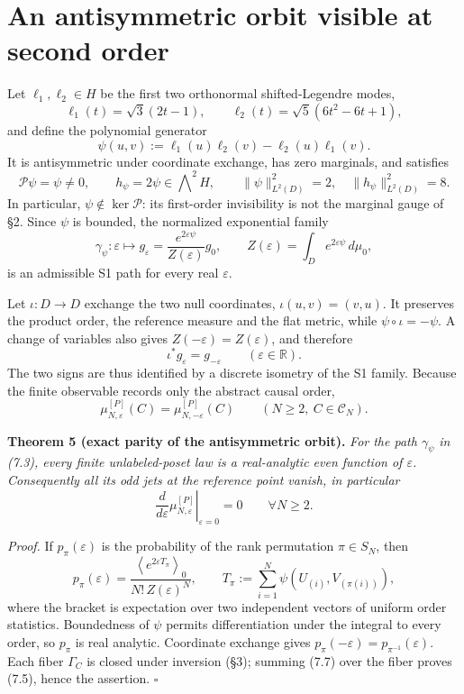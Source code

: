 \documentclass[11pt]{article}
\begin{document}
\section{An antisymmetric orbit visible at second order}

Let \(\ell_1,\ell_2\in H\) be the first two orthonormal shifted-Legendre modes, \[ \ell_1(t)=\sqrt3(2t-1), \qquad \ell_2(t)=\sqrt5(6t^2-6t+1), \] and define the polynomial generator \[ \boxed{ \psi(u,v):=\ell_1(u)\ell_2(v)-\ell_2(u)\ell_1(v).} \tag{7.1} \] It is antisymmetric under coordinate exchange, has zero marginals, and satisfies \[ \mathcal P\psi=\psi\ne0, \qquad h_\psi=2\psi\in\bigwedge\nolimits^2H, \qquad \|\psi\|_{L^2(D)}^2=2, \quad \|h_\psi\|_{L^2(D)}^2=8. \tag{7.2} \] In particular, \(\psi\notin\ker\mathcal P\): its first-order invisibility is not the marginal gauge of \S2. Since \(\psi\) is bounded, the normalized exponential family \[ \gamma_\psi:\varepsilon\longmapsto g_\varepsilon =\frac{e^{2\varepsilon\psi}}{Z(\varepsilon)}g_0, \qquad Z(\varepsilon)=\int_De^{2\varepsilon\psi}\,d\mu_0, \tag{7.3} \] is an admissible S1 path for every real \(\varepsilon\).

Let \(\iota:D\to D\) exchange the two null coordinates, \(\iota(u,v)=(v,u)\). It preserves the product order, the reference measure and the flat metric, while \(\psi\circ\iota=-\psi\). A change of variables also gives \(Z(-\varepsilon)=Z(\varepsilon)\), and therefore \[ \boxed{\iota^*g_\varepsilon=g_{-\varepsilon}} \qquad(\varepsilon\in\mathbb R). \tag{7.4} \] The two signs are thus identified by a discrete isometry of the S1 family. Because the finite observable records only the abstract causal order, \[ \boxed{ \mu_{N,\varepsilon}^{[P]}(C) =\mu_{N,-\varepsilon}^{[P]}(C)} \qquad(N\ge2,\ C\in\mathcal C_N). \tag{7.5} \]

\textbf{Theorem 5 (exact parity of the antisymmetric orbit).} \emph{For the path \(\gamma_\psi\) in (7.3), every finite unlabeled-poset law is a real-analytic even function of \(\varepsilon\). Consequently all its odd jets at the reference point vanish, in particular} \[ \left.\frac d{d\varepsilon} \mu_{N,\varepsilon}^{[P]}\right|_{\varepsilon=0}=0 \qquad\forall N\ge2. \tag{7.6} \]

\emph{Proof.} If \(p_\pi(\varepsilon)\) is the probability of the rank permutation \(\pi\in S_N\), then \[ p_\pi(\varepsilon) =\frac{\left\langle e^{2\varepsilon T_\pi}\right\rangle_0}        {N!\,Z(\varepsilon)^N}, \qquad T_\pi:=\sum_{i=1}^N \psi(U_{(i)},V_{(\pi(i))}), \tag{7.7} \] where the bracket is expectation over two independent vectors of uniform order statistics. Boundedness of \(\psi\) permits differentiation under the integral to every order, so \(p_\pi\) is real analytic. Coordinate exchange gives \(p_\pi(-\varepsilon)=p_{\pi^{-1}}(\varepsilon)\). Each fiber \(\Gamma_C\) is closed under inversion (\S3); summing (7.7) over the fiber proves (7.5), hence the assertion. \(\square\)
\end{document}
